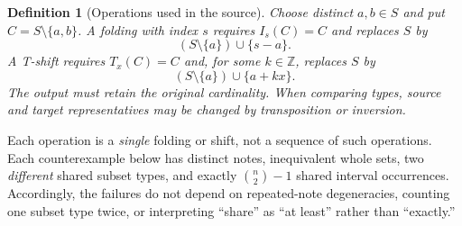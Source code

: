 \documentclass[10pt]{article}
\newtheorem{definition}[theorem]{Definition}
\theoremstyle{remark}
\newcommand{\Z}{\mathbb Z}
\begin{document}
\begin{definition}[Operations used in the source]
Choose distinct $a,b\in S$ and put $C=S\setminus\{a,b\}$.
A folding with index $s$ requires $I_s(C)=C$ and replaces $S$ by
\[
 (S\setminus\{a\})\cup\{s-a\}.
\]
A T-shift requires $T_x(C)=C$ and, for some $k\in\Z$, replaces $S$ by
\[
 (S\setminus\{a\})\cup\{a+kx\}.
\]
The output must retain the original cardinality. When comparing types, source
and target representatives may be changed by transposition or inversion.
\end{definition}

Each operation is a \emph{single} folding or shift, not a sequence of such
operations. Each counterexample below has distinct notes, inequivalent whole
sets, two \emph{different} shared subset types, and exactly
$\binom n2-1$ shared interval occurrences. Accordingly, the failures do not
depend on repeated-note degeneracies, counting one subset type twice, or
interpreting ``share'' as ``at least'' rather than ``exactly.''
\end{document}
